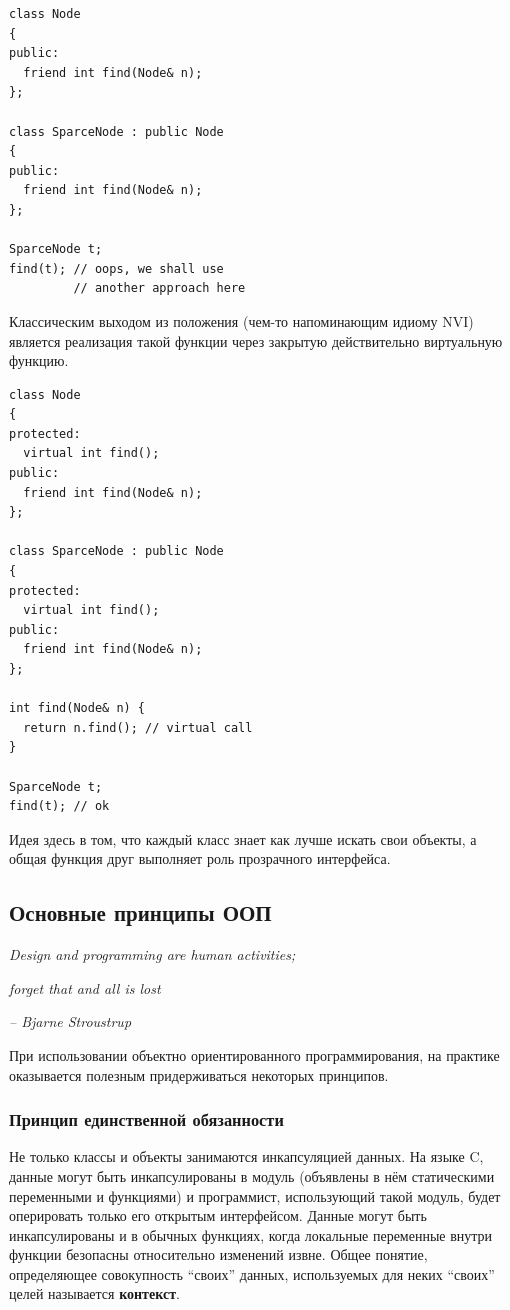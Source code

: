 \documentclass[a4paper,12pt,oneside]{article}
\begin{document}
\begin{lstlisting}
class Node
{
public:
  friend int find(Node& n);
};

class SparceNode : public Node
{
public:
  friend int find(Node& n);
};

SparceNode t;
find(t); // oops, we shall use 
         // another approach here
\end{lstlisting}

Классическим выходом из положения (чем-то напоминающим идиому NVI) является реализация такой функции через закрытую действительно виртуальную функцию.

\begin{lstlisting}
class Node
{
protected:
  virtual int find();
public:
  friend int find(Node& n);
};

class SparceNode : public Node
{
protected:
  virtual int find();
public:
  friend int find(Node& n);
};

int find(Node& n) {
  return n.find(); // virtual call
}

SparceNode t;
find(t); // ok
\end{lstlisting}

Идея здесь в том, что каждый класс знает как лучше искать свои объекты, а общая функция друг выполняет роль прозрачного интерфейса.

\pagebreak
\subsection{Основные принципы ООП}\label{SOLID}

\hfill\textit{Design and programming are human activities;}

\hfill\textit{forget that and all is lost}{\vspace{0.5em}}

\hfill\textit{-- Bjarne Stroustrup}

При использовании объектно ориентированного программирования, на практике оказывается полезным придерживаться некоторых принципов.

\subsubsection{Принцип единственной обязанности}\label{SRP}

Не только классы и объекты занимаются инкапсуляцией данных. На языке C, данные могут быть инкапсулированы в модуль (объявлены в нём статическими переменными и функциями) и программист, использующий такой модуль, будет оперировать только его открытым интерфейсом. Данные могут быть инкапсулированы и в обычных функциях, когда локальные переменные внутри функции безопасны относительно изменений извне. Общее понятие, определяющее совокупность ``своих'' данных, используемых для неких ``своих'' целей называется \textbf{контекст}.
\end{document}

